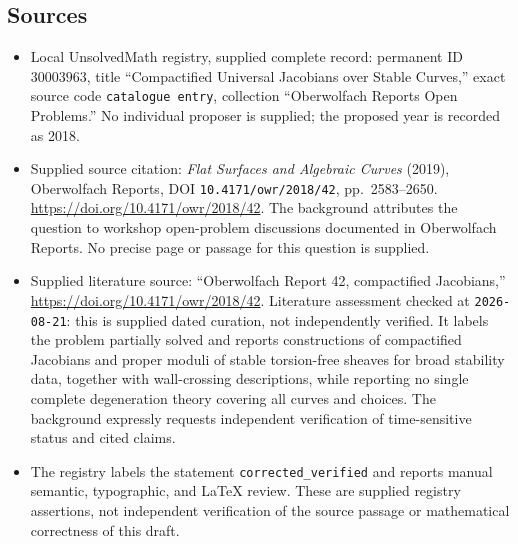\documentclass[11pt]{article}
\begin{document}
\subsection{Sources}
\begin{itemize}
\item Local UnsolvedMath registry, supplied complete record: permanent ID \(30003963\), title ``Compactified Universal Jacobians over Stable Curves,'' exact source code \texttt{catalogue entry}, collection ``Oberwolfach Reports Open Problems.'' No individual proposer is supplied; the proposed year is recorded as 2018.
\item Supplied source citation: \emph{Flat Surfaces and Algebraic Curves} (2019), Oberwolfach Reports, DOI \texttt{10.4171/owr/2018/42}, pp.\ 2583--2650. \url{https://doi.org/10.4171/owr/2018/42}. The background attributes the question to workshop open-problem discussions documented in Oberwolfach Reports. No precise page or passage for this question is supplied.
\item Supplied literature source: ``Oberwolfach Report 42, compactified Jacobians,'' \url{https://doi.org/10.4171/owr/2018/42}. Literature assessment checked at \texttt{2026-08-21}: this is supplied dated curation, not independently verified. It labels the problem partially solved and reports constructions of compactified Jacobians and proper moduli of stable torsion-free sheaves for broad stability data, together with wall-crossing descriptions, while reporting no single complete degeneration theory covering all curves and choices. The background expressly requests independent verification of time-sensitive status and cited claims.
\item The registry labels the statement \texttt{corrected\_verified} and reports manual semantic, typographic, and LaTeX review. These are supplied registry assertions, not independent verification of the source passage or mathematical correctness of this draft.
\end{itemize}
\end{document}

